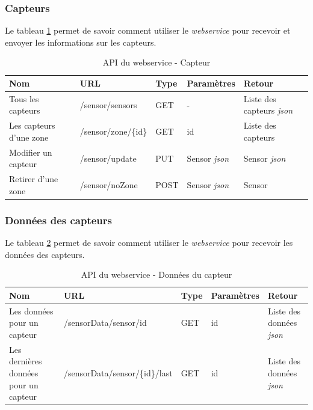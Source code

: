 \subsubsection{Capteurs}
Le tableau \ref{tab:apiCapteur} permet de savoir comment utiliser le \emph{\gls{webservice}} pour recevoir et envoyer les informations sur les capteurs.

\begin{table}[H]
\begin{tabularx}{\textwidth}{|X|m{3cm}|X|X|X|}
  \hline
  \bf{Nom}  & \bf{URL} & \bf{Type} & \bf{Paramètres} & \bf{Retour} \\
  \hline  
  Tous les capteurs  & /sensor/sensors & GET &  - & Liste des capteurs \emph{\gls{json}} \\
  \hline
 Les capteurs d'une zone  & /sensor/zone/\{id\} & GET &  id & Liste des capteurs \\
  \hline 
 Modifier un capteur  & /sensor/update & PUT & Sensor \emph{\gls{json}} & Sensor \emph{\gls{json}} \\
  \hline   
   Retirer d'une zone & /sensor/noZone & POST &  Sensor \emph{\gls{json}} & Sensor \\
  \hline  
\end{tabularx}
\caption{API du webservice - Capteur}
\label{tab:apiCapteur}
\end{table}

\subsubsection{Données des capteurs}
Le tableau \ref{tab:apiCapteurData} permet de savoir comment utiliser le \emph{\gls{webservice}} pour recevoir les données des capteurs.

\begin{table}[H]
\begin{tabularx}{\textwidth}{|X|X|X|X|X|}
  \hline
  \bf{Nom}  & \bf{URL} & \bf{Type} & \bf{Paramètres} & \bf{Retour} \\
  \hline  
  Les données pour un capteur  & /sensorData/sensor/{id} & GET &  id & Liste des données \emph{\gls{json}} \\
  \hline
 Les dernières données pour un capteur  & /sensorData/sensor/\{id\}/last & GET & id & Liste des données \emph{\gls{json}} \\
  \hline 
\end{tabularx}
\caption{API du webservice - Données du capteur}
\label{tab:apiCapteurData}
\end{table}
